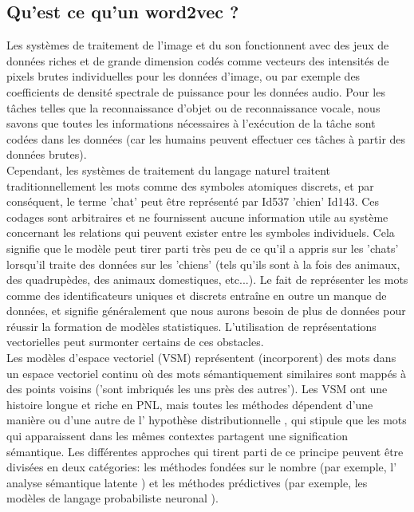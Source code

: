 \subsection{Qu'est ce qu'un word2vec ?}
Les systèmes de traitement de l'image et du son fonctionnent avec des jeux de données riches et de grande dimension codés comme vecteurs des intensités de pixels brutes individuelles pour les données d'image, ou par exemple des coefficients de densité spectrale de puissance pour les données audio. Pour les tâches telles que la reconnaissance d'objet ou de reconnaissance vocale, nous savons que toutes les informations nécessaires à l'exécution de la tâche sont codées dans les données (car les humains peuvent effectuer ces tâches à partir des données brutes). \\[0.5cm]
Cependant, les systèmes de traitement du langage naturel traitent traditionnellement les mots comme des symboles atomiques discrets, et par conséquent, le terme 'chat' peut être représenté par Id537 'chien' Id143. Ces codages sont arbitraires et ne fournissent aucune information utile au système concernant les relations qui peuvent exister entre les symboles individuels. Cela signifie que le modèle peut tirer parti très peu de ce qu'il a appris sur les 'chats' lorsqu'il traite des données sur les 'chiens' (tels qu'ils sont à la fois des animaux, des quadrupèdes, des animaux domestiques, etc...). Le fait de représenter les mots comme des identificateurs uniques et discrets entraîne en outre un manque de données, et signifie généralement que nous aurons besoin de plus de données pour réussir la formation de modèles statistiques. L'utilisation de représentations vectorielles peut surmonter certains de ces obstacles.\\[0.5cm]
Les modèles d'espace vectoriel (VSM) représentent (incorporent) des mots dans un espace vectoriel continu où des mots sémantiquement similaires sont mappés à des points voisins ('sont imbriqués les uns près des autres'). Les VSM ont une histoire longue et riche en PNL, mais toutes les méthodes dépendent d'une manière ou d'une autre de l' hypothèse distributionnelle , qui stipule que les mots qui apparaissent dans les mêmes contextes partagent une signification sémantique. Les différentes approches qui tirent parti de ce principe peuvent être divisées en deux catégories: les méthodes fondées sur le nombre (par exemple, l' analyse sémantique latente ) et les méthodes prédictives (par exemple, les modèles de langage probabiliste neuronal ).\\[0.5cm]
